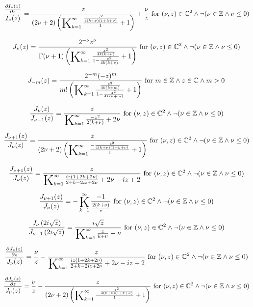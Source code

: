 \documentclass{article}
\newcommand{\bigK}{\mathop{\raisebox{-5pt}{\huge K}}}
\begin{document}
\[\frac{\frac{\partial I_{\nu }(z)}{\partial z}}{I_{\nu }(z)}=\frac{z}{(2 \nu +2) \left(\bigK_{k=1}^{\infty}\frac{\frac{z^2}{4 (k+\nu ) (1+k+\nu )}}{1}+1\right)}+\frac{\nu }{z}\text{ for }(\nu ,z)\in \mathbb{C}^2\land \neg (\nu \in \mathbb{Z}\land \nu \leq 0)\] 

\[J_{\nu }(z)=\frac{2^{-\nu } z^{\nu }}{\Gamma (\nu +1) \left(\bigK_{k=1}^{\infty}\frac{\frac{z^2}{4 k (k+\nu )}}{1-\frac{z^2}{4 k (k+\nu )}}+1\right)}\text{ for }(\nu ,z)\in \mathbb{C}^2\land \neg (\nu \in \mathbb{Z}\land \nu \leq 0)\] 

\[J_{-m}(z)=\frac{2^{-m} (-z)^m}{m! \left(\bigK_{k=1}^{\infty}\frac{\frac{z^2}{4 k (k+m)}}{1-\frac{z^2}{4 k (k+m)}}+1\right)}\text{ for }m\in \mathbb{Z}\land z\in \mathbb{C}\land m>0\] 

\[\frac{J_{\nu }(z)}{J_{\nu -1}(z)}=\frac{z}{\bigK_{k=1}^{\infty}\frac{-z^2}{2 (k+\nu )}+2 \nu }\text{ for }(\nu ,z)\in \mathbb{C}^2\land \neg (\nu \in \mathbb{Z}\land \nu \leq 0)\] 

\[\frac{J_{\nu +1}(z)}{J_{\nu }(z)}=\frac{z}{(2 \nu +2) \left(\bigK_{k=1}^{\infty}\frac{-\frac{z^2}{4 (k+\nu ) (1+k+\nu )}}{1}+1\right)}\text{ for }(\nu ,z)\in \mathbb{C}^2\land \neg (\nu \in \mathbb{Z}\land \nu \leq 0)\] 

\[\frac{J_{\nu +1}(z)}{J_{\nu }(z)}=\frac{z}{\bigK_{k=1}^{\infty}\frac{i z (1+2 k+2 \nu )}{2+k-2 i z+2 \nu }+2 \nu -i z+2}\text{ for }(\nu ,z)\in \mathbb{C}^2\land \neg (\nu \in \mathbb{Z}\land \nu \leq 0)\] 

\[\frac{J_{\nu +1}(z)}{J_{\nu }(z)}=-\bigK_{k=1}^{\infty}\frac{-1}{\frac{2 (k+\nu )}{z}}\text{ for }(\nu ,z)\in \mathbb{C}^2\land \neg (\nu \in \mathbb{Z}\land \nu \leq 0)\] 

\[\frac{J_{\nu }\left(2 i \sqrt{z}\right)}{J_{\nu -1}\left(2 i \sqrt{z}\right)}=\frac{i \sqrt{z}}{\bigK_{k=1}^{\infty}\frac{z}{k+\nu }+\nu }\text{ for }(\nu ,z)\in \mathbb{C}^2\land \neg (\nu \in \mathbb{Z}\land \nu \leq 0)\] 

\[\frac{\frac{\partial J_{\nu }(z)}{\partial z}}{J_{\nu }(z)}=\frac{\nu }{z}-\frac{z}{\bigK_{k=1}^{\infty}\frac{i z (1+2 k+2 \nu )}{2+k-2 i z+2 \nu }+2 \nu -i z+2}\text{ for }(\nu ,z)\in \mathbb{C}^2\land \neg (\nu \in \mathbb{Z}\land \nu \leq 0)\] 

\[\frac{\frac{\partial J_{\nu }(z)}{\partial z}}{J_{\nu }(z)}=\frac{\nu }{z}-\frac{z}{(2 \nu +2) \left(\bigK_{k=1}^{\infty}\frac{-\frac{z^2}{4 (k+\nu ) (1+k+\nu )}}{1}+1\right)}\text{ for }(\nu ,z)\in \mathbb{C}^2\land \neg (\nu \in \mathbb{Z}\land \nu \leq 0)\] 
\end{document}
